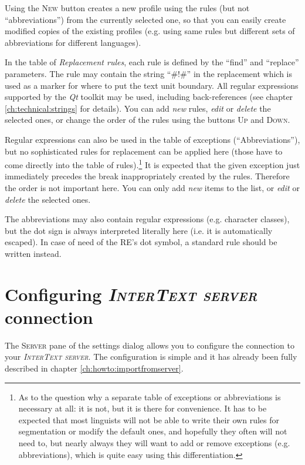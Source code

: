 \documentclass[a4paper,10pt,oneside]{book}
\newcommand{\ITserver}{\textit{\textsc{InterText server}}\xspace}
\newcommand{\menu}[1]{\textsc{#1}}
\begin{document}
Using the \menu{New} button creates a new profile using the rules (but not ``abbreviations'') from the currently selected one, so that you can easily create modified copies of the existing profiles (e.g. using same rules but different sets of abbreviations for different languages).

In the table of \emph{Replacement rules}, each rule is defined by the ``find'' and ``replace'' parameters. The rule may contain the string ``\#!\#'' in the replacement which is used as a marker for where to put the text unit boundary. All regular expressions supported by the \emph{Qt} toolkit may be used, including back-references (see chapter \ref{ch:technical:strings} for details). You can add \emph{new} rules, \emph{edit} or \emph{delete} the selected ones, or change the order of the rules using the buttons \menu{Up} and \menu{Down}.

Regular expressions can also be used in the table of exceptions (``Abbreviations''), but no sophisticated rules for replacement can be applied here (those have to come directly into the table of rules).\footnote{As to the question why a separate table of exceptions or abbreviations is necessary at all: it is not, but it is there for convenience. It has to be expected that most linguists will not be able to write their own rules for segmentation or modify the default ones, and hopefully they often will not need to, but nearly always they will want to add or remove exceptions (e.g. abbreviations), which is quite easy using this differentiation.} It is expected that the given exception just immediately precedes the break inappropriately created by the rules. Therefore the order is not important here. You can only add \emph{new} items to the list, or \emph{edit} or \emph{delete} the selected ones.

The abbreviations may also contain regular expressions (e.g. character classes), but the dot sign is always interpreted literally here (i.e. it is automatically escaped). In case of need of the RE's dot symbol, a standard rule should be written instead.

\section{Configuring \ITserver connection}\label{ch:detail:config:server}

The \menu{Server} pane of the settings dialog allows you to configure the connection to your \ITserver. The configuration is simple and it has already been fully described in chapter \ref{ch:howto:importfromserver}.
\end{document}
